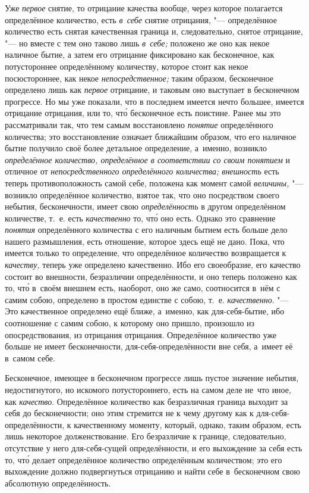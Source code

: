 Уже {\em первое} снятие, то отрицание качества вообще, через которое полагается
определённое количество, есть {\em в~себе} снятие отрицания, "--- определённое
количество есть снятая качественная граница и, следовательно, снятое отрицание,
"--- но вместе с тем оно таково лишь {\em в~себе;} положено же оно как некое
наличное бытие, а затем его отрицание фиксировано как бесконечное, как
потустороннее определённому количеству, которое стоит как некое посюстороннее,
как некое {\em непосредственное;} таким образом, бесконечное определено лишь
как {\em первое} отрицание, и таковым оно выступает в бесконечном прогрессе.
Но мы уже показали, что в последнем имеется нечто большее, имеется отрицание
отрицания, или то, чт\'{о} бесконечное есть поистине. Ранее мы это
рассматривали так, что тем самым восстановлено {\em понятие} определённого
количества; это восстановление означает ближайшим образом, что его наличное
бытие получило своё более детальное определение, а~именно, возникло
{\em определённое количество, определённое в соответствии со своим понятием}
и отличное от {\em непосредственного определённого количества; внешность} есть
теперь противоположность самой себе, положена как момент самой {\em величины,}
"--- возникло определённое количество, взятое так, что оно посредством своего
небытия, бесконечности, имеет свою {\em определённость} в другом определённом
количестве, т.~е. есть {\em качественно} то, чт\'{о} оно есть. Однако это
сравнение {\em понятия} определённого количества с его наличным бытием есть
больше дело нашего размышления, есть отношение, которое здесь ещё не дано.
Пока, что имеется только то определение, что определённое количество
возвращается к {\em качеству,} теперь уже определено качественно. Ибо его
своеобразие, его качество состоит во внешности, безразличии определённости,
и оно теперь положено как то, чт\'{о} в~своём внешнем есть, наоборот, оно же
само, соотносится в~нём с самим собою, определено в простом единстве с собою,
т.~е. {\em качественно}. "--- Это качественное определено ещё ближе, а~именно,
как для-себя-бытие, ибо соотношение с самим собою, к которому оно пришло,
произошло из опосредствования, из отрицания отрицания. Определённое количество
уже больше не имеет бесконечности, для-себя-определённости вне себя,
а~имеет её в~самом себе.

Бесконечное, имеющее в бесконечном прогрессе лишь пустое значение небытия,
недостигнутого, но искомого потустороннего, есть на самом деле не~что иное,
как {\em качество}. Определённое количество как безразличная граница выходит
за себя до бесконечности; оно этим стремится не к чему другому как
к для-себя-определённости, к качественному моменту, который, однако, таким
образом, есть лишь некоторое долженствование. Его безразличие к границе,
следовательно, отсутствие у него для-себя-сущей определённости, и его
выхождение за себя есть то, чт\'{о} делает определённое количество определённым
количеством; это его выхождение должно подвергнуться отрицанию и найти
себе в~бесконечном свою абсолютную определённость.

